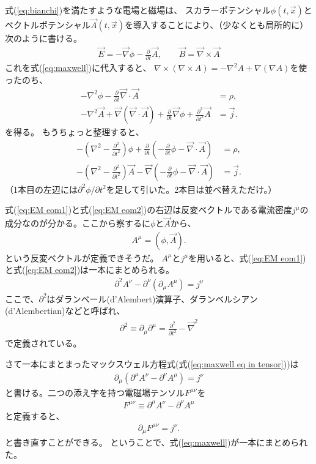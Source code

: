 \documentclass[10pt,a4paper]{jarticle}
\begin{document}
式(\ref{eq:bianchi})を満たすような電場と磁場は、
スカラーポテンシャル$\phi(t,\vec x)$とベクトルポテンシャル$\vec A(t,\vec x)$を導入することにより、（少なくとも局所的に）次のように書ける。
\begin{align}
\vec E = -\vec\nabla \phi - \frac{\partial}{\partial t}\vec A, \qquad
\vec B = \vec\nabla \times \vec A
\label{eq:E and B from A}
\end{align}
これを式(\ref{eq:maxwell})に代入すると、
$\nabla \times (\nabla \times A) = -\nabla^2 A + \nabla (\nabla A) $を使ったのち、
\begin{align}
-\nabla^2 \phi - \frac{\partial}{\partial t} \vec \nabla \cdot \vec A &= \rho, \\
-\nabla^2 \vec A + \vec \nabla (\vec \nabla \cdot \vec A) + \frac{\partial}{\partial t}\vec\nabla\phi + \frac{\partial^2}{\partial t^2} \vec A &= \vec j.
\end{align}
を得る。
もうちょっと整理すると、
\begin{align}
-\left(\nabla^2 - \frac{\partial^2}{\partial t^2}\right)\phi + \frac{\partial}{\partial t} \left( -\frac{\partial}{\partial t}\phi - \vec \nabla \cdot \vec A \right) &= \rho, \label{eq:EM eom1}\\
- \left( \nabla^2 - \frac{\partial^2}{\partial t^2}\right) \vec A
-\vec\nabla \left( -\frac{\partial}{\partial t}\phi - \vec \nabla \cdot \vec A \right)
 &= \vec j. \label{eq:EM eom2}
\end{align}
（1本目の左辺には$\partial^2\phi/\partial t^2$を足して引いた。2本目は並べ替えただけ。）

式(\ref{eq:EM eom1})と式(\ref{eq:EM eom2})の右辺は反変ベクトルである電流密度$j^\mu$の成分なのが分かる。ここから察するに$\phi$と$\vec A$から、
\begin{align}
A^\mu = (\phi, \vec A).
\end{align}
という反変ベクトルが定義できそうだ。
$A^\mu$と$j^\mu$を用いると、式(\ref{eq:EM eom1})と式(\ref{eq:EM eom2})は一本にまとめられる。
\begin{align}
\partial^2 A^\nu - \partial^\nu (\partial_\mu A^\mu) = j^\nu \label{eq:maxwell eq in tensor}
\end{align}
ここで、$\partial^2$はダランベール(d'Alembert)演算子、ダランベルシアン(d'Alembertian)などと呼ばれ、
\begin{align}
\partial^2 \equiv \partial_\mu \partial^\mu = \frac{\partial^2}{\partial t^2} - \vec\nabla^2
\end{align}
で定義されている。

さて一本にまとまったマックスウェル方程式(式(\ref{eq:maxwell eq in tensor}))は
\begin{align}
\partial_\mu ( \partial^\mu A^\nu - \partial^\nu A^\mu  ) = j^\nu
\end{align}
と書ける。二つの添え字を持つ電磁場テンソル$F^{\mu\nu}$を
\begin{align}
F^{\mu\nu} \equiv \partial^\mu A^\nu - \partial^\nu A^\mu
\end{align}
と定義すると、
\begin{align}
\partial_\mu F^{\mu\nu} = j^\nu.
\end{align}
と書き直すことができる。
ということで、式(\ref{eq:maxwell})が一本にまとめられた。
\end{document}
